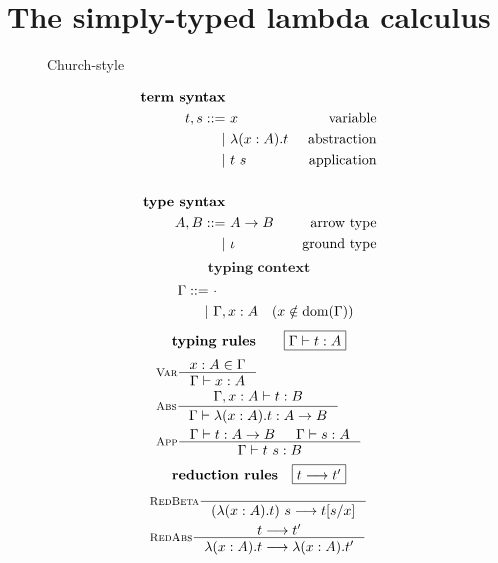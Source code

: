 \section{The simply-typed lambda calculus}\label{sec:stlc}
\begin{figure}
\begin{singlespace}
\begin{minipage}{.46\textwidth}
        \begin{center}Church-style\end{center}
\def\baselinestretch{0}
\small
\begin{align*}
\textbf{term syntax} \\
t,s ::= &~ x           & \text{variable}    \\
      | &~ \lambda(x:A) . t & \text{abstraction} \\
      | &~ t ~ s       & \text{application} \\
\\
\textbf{type syntax} \\
A,B ::= &~ A -> B  & \text{arrow type} \\
      | &~ \iota   & \text{ground type}   \\
\end{align*}
\[ \textbf{typing context} \]\vspace*{-1em}
\begin{align*}\quad
\Gamma ::= &~ \cdot \\
         | &~ \Gamma, x:A \quad (x\notin \mathop{\mathrm{dom}}(\Gamma)) \\
\end{align*}
\[ \textbf{typing rules}
        \qquad \framebox{$\Gamma |- t : A$} \]
\vspace*{-1em}
\begin{align*}
& \inference[\sc Var]{x:A \in \Gamma}{\Gamma |- x:A} \\
& \inference[\sc Abs]{\Gamma,x:A |- t : B}
                     {\Gamma |- \l(x:A).t : A -> B} \\
& \inference[\sc App]{\Gamma |- t : A -> B & \Gamma |- s : A}
                     {\Gamma |- t~s : B} \\
\end{align*}
\[ \textbf{reduction rules}
        \quad \framebox{$t --> t'$} \]
\vspace*{-1em}
\begin{align*}
& \inference[\sc RedBeta]{}{(\l(x:A).t)~s --> t[s/x]} \\
& \inference[\sc RedAbs]{t --> t'}{\l(x:A).t --> \l(x:A).t'} \\

\end{align*}
\end{minipage}
\end{singlespace}
\end{figure}
